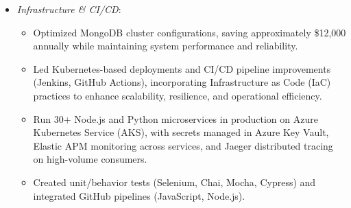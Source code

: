\documentclass{res} %
\begin{document}
\begin{resume}
\begin{itemize}
\begin{itemize}
      \end{itemize}
    \item \emph{Infrastructure \& CI/CD}:
      \begin{itemize}
        \item Optimized MongoDB cluster configurations, saving approximately \$12,000 annually while maintaining system performance and reliability.
        \item Led Kubernetes-based deployments and CI/CD pipeline improvements (Jenkins, GitHub Actions), incorporating Infrastructure as Code (IaC) practices to enhance scalability, resilience, and operational efficiency.
        \item Run 30+ Node.js and Python microservices in production on Azure Kubernetes Service (AKS), with secrets managed in Azure Key Vault, Elastic APM monitoring across services, and Jaeger distributed tracing on high-volume consumers.
        \item Created unit/behavior tests (Selenium, Chai, Mocha, Cypress) and integrated GitHub pipelines (JavaScript, Node.js).
      \end{itemize}
  \end{itemize}


\end{resume}
\end{document}
